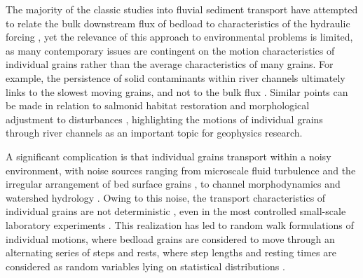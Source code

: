 \documentclass[draft]{agujournal2018}
\begin{document}
The majority of the classic studies into fluvial sediment transport have attempted to relate the bulk downstream flux of bedload to characteristics of the hydraulic forcing \citep[e.g.][]{MeyerPeter1948, Yalin1972}, yet the relevance of this approach to environmental problems is limited, as many contemporary issues are contingent on the motion characteristics of individual grains rather than the average characteristics of many grains.
For example, the persistence of solid contaminants within river channels ultimately links to the slowest moving grains, and not to the bulk flux \citep{Malmon2005}.
Similar points can be made in relation to salmonid habitat restoration \citep[e.g.][]{Gaeuman2017} and morphological adjustment to disturbances \citep{Hassan2017}, highlighting the motions of individual grains through river channels as an important topic for geophysics research.

A significant complication is that individual grains transport within a noisy environment, with noise sources ranging from microscale fluid turbulence \citep{Celik2014} and the irregular arrangement of bed surface grains \citep{Heyman2019}, to channel morphodynamics \citep{Hassan2017} and watershed hydrology \citep{Phillips2013}.
Owing to this noise, the transport characteristics of individual grains are not deterministic \citep[e.g.][]{Einstein1937}, even in the most controlled small-scale laboratory experiments \citep[e.g.][]{Fathel2015, Heyman2016}.
This realization has led to random walk formulations of individual motions, where bedload grains are considered to move through an alternating series of steps and rests, where step lengths and resting times are considered as random variables lying on statistical distributions \citep{Einstein1937, Yano1969, Nakagawa1976, Hassan1991, Bradley2012}.
\end{document}

